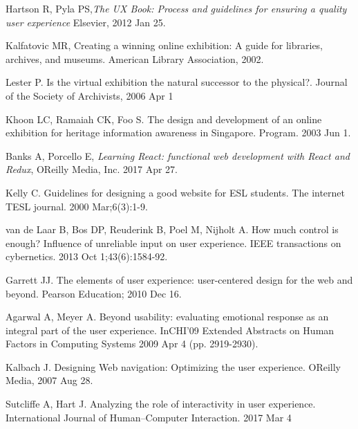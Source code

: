 

%

\begin{thebibliography}{1}


Hartson R, Pyla PS,\emph{The UX Book: Process and guidelines for ensuring a quality user experience} Elsevier, 2012 Jan 25.

Kalfatovic MR, Creating a winning online exhibition: A guide for libraries, archives, and museums. American Library Association, 2002.

Lester P. Is the virtual exhibition the natural successor to the physical?. Journal of the Society of Archivists, 2006 Apr 1

Khoon LC, Ramaiah CK, Foo S. The design and development of an online exhibition for heritage information awareness in Singapore. Program. 2003 Jun 1.

Banks A, Porcello E, \emph{Learning React: functional web development with React and Redux}, OReilly Media, Inc. 2017 Apr 27.

Kelly C. Guidelines for designing a good website for ESL students. The internet TESL journal. 2000 Mar;6(3):1-9.

van de Laar B, Bos DP, Reuderink B, Poel M, Nijholt A. How much control is enough? Influence of unreliable input on user experience. IEEE transactions on cybernetics. 2013 Oct 1;43(6):1584-92.

Garrett JJ. The elements of user experience: user-centered design for the web and beyond. Pearson Education; 2010 Dec 16.

Agarwal A, Meyer A. Beyond usability: evaluating emotional response as an integral part of the user experience. InCHI'09 Extended Abstracts on Human Factors in Computing Systems 2009 Apr 4 (pp. 2919-2930).

Kalbach J. Designing Web navigation: Optimizing the user experience. OReilly Media, 2007 Aug 28.

Sutcliffe A, Hart J. Analyzing the role of interactivity in user experience. International Journal of Human–Computer Interaction. 2017 Mar 4



\end{thebibliography}
